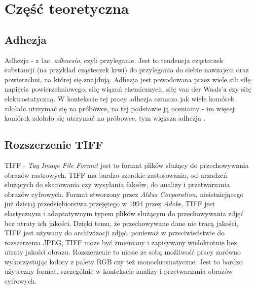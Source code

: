 \documentclass{article}
\begin{document}
    \newpage
    \section{Część teoretyczna}
        \subsection{Adhezja}
        {
            \label{sec:adhezja}
            \Large
            \justifying
            \quad
            Adhezja - z łac. \textit{adhaesio}, czyli przyleganie.
            Jest to tendencja cząsteczek substancji (na przykład cząsteczek krwi) do przylegania do siebie nawzajem oraz powierzchni, na której się znajdują.
            Adhezja jest powodowana przez wiele sił: siłę napięcia powierzchniowego, siłę wiązań chemicznych, siłę van der Waals'a czy siłę elektrostatyczną.
            W kontekscie tej pracy adhezja oznacza jak wiele komórek zdołało utrzymać się na próbówce, na tej podstawie ją oceniamy - im więcej komórek zdołało się utrzymać na próbowce, tym większa adhezja \cite{adhezja}.
        }
        \subsection{Rozszerzenie TIFF}
        {
            \label{sec:rozszerzenie-tiff}
            \Large
            \justifying
            \quad
            TIFF - \textit{Tag Image File Format} jest to format plików służący do przechowywania obrazów rastrowych.
            TIFF ma bardzo szerokie zastosowania, od urzadzeń służących do skanowania czy wysyłania faksów, do analizy i przetwarzania obrazów cyfrowych.
            Format stworzony przez \textit{Aldus Corporation}, nieistniejącego już dzisiaj przedsiębiorstwa przejętego w 1994 przez \textit{Adobe}.
            TIFF jest elastycznym i adaptatywnym typem plików służącym do przechowywania zdjęć bez utraty ich jakości.
            Dzięki temu, że przechowywane dane nie tracą jakości, TIFF jest używany do archiwizacji zdjęć, ponieważ w przeciwieństwie do rozszerzenia JPEG,
            TIFF może być zmieniany i zapisywany wielokrotnie bez utraty jakości obrazu.
            Rozszerzenie to niesie ze sobą możliwość pracy zarówno wykorzystując kolory z palety RGB czy też monochromatyczne.
            Jest to bardzo użyteczny format, szczególnie w kontekscie analizy i przetwarzania obrazów cyfrowych. \cite{Encyclopedia of Graphics File Formats: The Complete Reference}
        }
\end{document}
